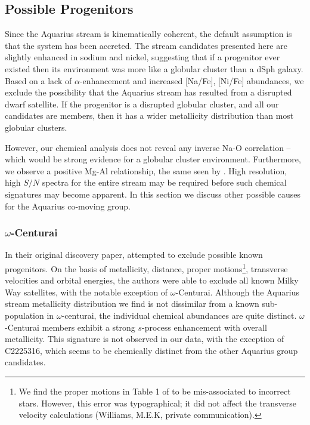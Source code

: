\documentclass{emulateapj}
\begin{document}
\subsection{Possible Progenitors}

Since the Aquarius stream is kinematically coherent, the default assumption is that the system has been accreted. The stream candidates presented here are slightly enhanced in sodium and nickel, suggesting that if a progenitor ever existed then its environment was more like a globular cluster than a dSph galaxy. Based on a lack of $\alpha$-enhancement and increased [Na/Fe], [Ni/Fe] abundances, we exclude the possibility that the Aquarius stream has resulted from a disrupted dwarf satellite. If the progenitor is a disrupted globular cluster, and all our candidates are members, then it has a wider metallicity distribution than most globular clusters. 

However, our chemical analysis does not reveal any inverse Na-O correlation \--- which would be strong evidence for a globular cluster environment. Furthermore, we observe a positive Mg-Al relationship, the same seen by \citet{wylie-de-boer;et-al_2012}. High resolution, high $S/N$ spectra for the entire stream may be required before such chemical signatures may become apparent. In this section we discuss other possible causes for the Aquarius co-moving group.

\subsubsection{$\omega$-Centurai}

In their original discovery paper, \citet{williams;et-al_2011} attempted to exclude possible known progenitors. On the basis of metallicity, distance, proper motions\footnote{We find the proper motions in Table 1 of \citet{williams;et-al_2011} to be mis-associated to incorrect stars. However, this  error was typographical; it did not affect the transverse velocity calculations (Williams, M.E.K, private communication).}, transverse velocities and orbital energies, the authors were able to exclude all known Milky Way satellites, with the notable exception of $\omega$-Centurai. Although the Aquarius stream metallicity distribution we find is not dissimilar from a known sub-population in $\omega$-centurai, the individual chemical abundances are quite distinct. $\omega$-Centurai members exhibit a strong $s$-process enhancement with overall metallicity. This signature is not observed in our data, with the exception of C2225316, which seems to be chemically distinct from the other Aquarius group candidates.
\end{document}
